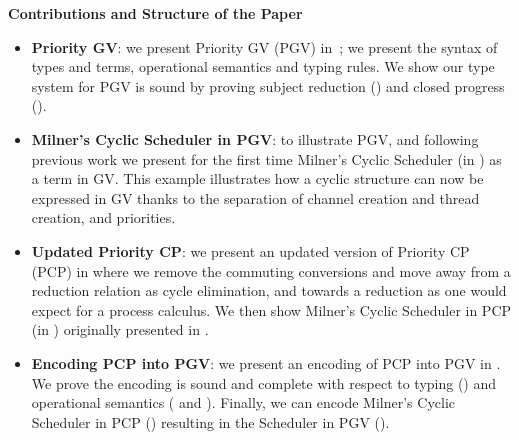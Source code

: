 \documentclass[main.tex]{subfiles}
\begin{document}
\noindent
\textbf{Contributions and Structure of the Paper}
\begin{itemize}
\item \textbf{Priority GV}: we present Priority GV (PGV) in~; we present the syntax of types and terms, operational semantics and typing rules. We show our type system for PGV is sound by proving subject reduction () and closed progress ().
\item \textbf{Milner's Cyclic Scheduler in PGV}: to illustrate PGV, and following previous work \cite{dardhagay18} we present for the first time Milner's Cyclic Scheduler \cite{milner89} (in ) as a term in GV. This example illustrates how a cyclic structure can now be expressed in GV thanks to the separation of channel creation and thread creation, and priorities.
\item \textbf{Updated Priority CP}: we present an updated version of Priority CP (PCP) \cite{dardhagay18} in  where we remove the commuting conversions and move away from a reduction relation as cycle elimination, and towards a reduction as one would expect for a process calculus. We then show Milner's Cyclic Scheduler in PCP (in ) originally presented in \cite{dardhagay18}.
\item \textbf{Encoding PCP into PGV}: we present an encoding of PCP into PGV in . We prove the encoding is sound and complete with respect to typing () and operational semantics ( and ). Finally, we can encode Milner's Cyclic Scheduler in PCP () resulting in the Scheduler in PGV ().
\end{itemize}
\end{document}
